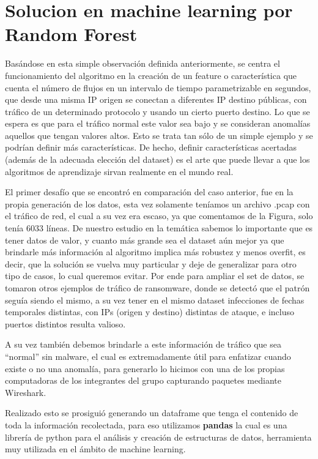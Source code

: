 \documentclass[a4paper,10pt]{article}
\begin{document}
\section{Solucion en machine learning por Random Forest}

Basándose en esta simple observación definida anteriormente, se centra el funcionamiento del algoritmo en la creación de un feature o característica que cuenta el número de flujos en un intervalo de tiempo parametrizable en segundos, que desde una misma IP origen se conectan a diferentes IP destino públicas, con tráfico de un determinado protocolo y usando un cierto puerto destino. Lo que se espera es que para el tráfico normal este valor sea bajo y se consideran anomalías aquellos que tengan valores altos. Esto se trata tan sólo de un simple ejemplo y se podrían definir más características. De hecho, definir características acertadas (además de la adecuada elección del dataset) es el arte que puede llevar a que los algoritmos de aprendizaje sirvan realmente en el mundo real.

El primer desafío que se encontró en comparación del caso anterior, fue en la propia generación de los datos, esta vez solamente teníamos un archivo .pcap con el tráfico de red, el cual a su vez era escaso, ya que comentamos de la Figura, solo tenía 6033 líneas. De nuestro estudio en la temática sabemos lo importante que es tener datos de valor, y cuanto más grande sea el dataset aún mejor ya que brindarle más información al algoritmo implica más robustez y menos overfit, es decir, que la solución se vuelva muy particular y deje de generalizar para otro tipo de casos, lo cual queremos evitar. Por ende para ampliar el set de datos, se tomaron otros ejemplos de tráfico de ransomware, donde se detectó que el patrón seguía siendo el mismo, a su vez tener en el mismo dataset infecciones de fechas temporales distintas, con IPs (origen y destino) distintas de ataque, e incluso puertos distintos resulta valioso.

A su vez también debemos brindarle a este información de tráfico que sea “normal” sin malware, el cual es extremadamente útil para enfatizar cuando existe o no una anomalía, para generarlo lo hicimos con una de los propias computadoras de los integrantes del grupo capturando paquetes mediante Wireshark.


\medskip

Realizado esto se prosiguió generando un dataframe que tenga el contenido de toda la información recolectada, para eso utilizamos \textbf{pandas} la cual es una librería de python para el análisis y creación de estructuras de datos, herramienta muy utilizada en el ámbito de machine learning. 
\end{document}
